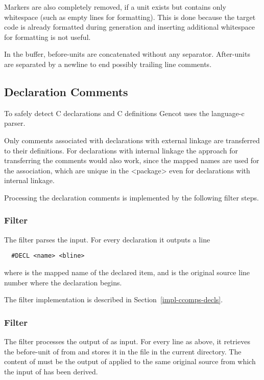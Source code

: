 Markers are also completely removed, if a unit exists but contains only whitespace (such as empty lines for
formatting). This is done because the target code is already formatted during generation and inserting additional
whitespace for formatting is not useful.

In the buffer, before-units are concatenated without any separator. After-units are separated by a newline to end possibly 
trailing line comments.

\subsection{Declaration Comments}
\label{impl-comments-decl}

To safely detect C declarations and C definitions Gencot uses the language-c parser. 

Only comments associated with declarations with external linkage are transferred to their definitions. For declarations
with internal linkage the approach for transferring the comments would also work, since the mapped names are used for 
the association, which are unique in the <package> even for declarations with internal linkage.

Processing the declaration comments is implemented by the following filter steps. 

\subsubsection{Filter }

The filter  parses the input. For every declaration it outputs a line
\begin{verbatim}
  #DECL <name> <bline>
\end{verbatim}
where  is the mapped name of the declared item, and  is the original source line 
number where the declaration begins.

The filter implementation is described in Section~\ref{impl-ccomps-decls}.

\subsubsection{Filter }

The filter  processes the output of  as input. For every
line as above, it retrieves the before-unit of  from 
and stores it in the file  in the
current directory. The content of  must be the output of  applied to the same
original source from which the input of  has been derived.

